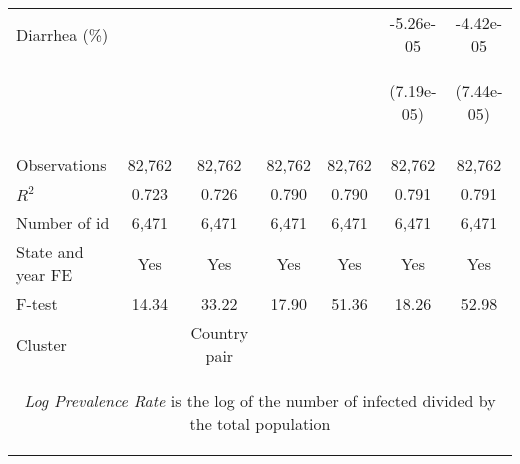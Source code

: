 \documentclass{article}
\begin{document}
\begin{table}[htbp]
{\begin{tabular}{lcccccc}
Diarrhea (\%) &  &  &  &  & -5.26e-05 & -4.42e-05 \\
\vspace{4pt} & \begin{footnotesize}\end{footnotesize} & \begin{footnotesize}\end{footnotesize} & \begin{footnotesize}\end{footnotesize} & \begin{footnotesize}\end{footnotesize} & \begin{footnotesize}(7.19e-05)\end{footnotesize} & \begin{footnotesize}(7.44e-05)\end{footnotesize} \\
\vspace{4pt} & \begin{footnotesize}\end{footnotesize} & \begin{footnotesize}\end{footnotesize} & \begin{footnotesize}\end{footnotesize} & \begin{footnotesize}\end{footnotesize} & \begin{footnotesize}\end{footnotesize} & \begin{footnotesize}\end{footnotesize} \\
Observations & 82,762 & 82,762 & 82,762 & 82,762 & 82,762 & 82,762 \\
$R^2$ & 0.723 & 0.726 & 0.790 & 0.790 & 0.791 & 0.791 \\
Number of id & 6,471 & 6,471 & 6,471 & 6,471 & 6,471 & 6,471 \\
State and year FE & Yes & Yes & Yes & Yes & Yes & Yes \\
F-test & 14.34 & 33.22 & 17.90 & 51.36 & 18.26 & 52.98 \\
Cluster & & \multicolumn{1}{c}{Country pair} \\ \hline
\multicolumn{7}{c}{\begin{footnotesize} \textit{Log Prevalence Rate} is the log of the number of infected divided by the total population \end{footnotesize} }\\

\end{tabular}}
\end{table}
\end{document}
